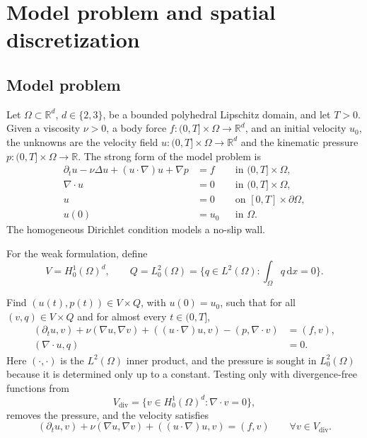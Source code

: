 \documentclass[11pt]{article}
\theoremstyle{remark}\newtheorem{remark}{Remark}
\newcommand{\R}{\mathbb{R}}
\newcommand{\dd}{\mathrm{d}}
\theoremstyle{plain}
\newcommand{\new}[1]{{\color{blue}#1}}
\begin{document}
\section{\new{Model problem and spatial discretization}}\label{sec:model}
\new{\subsection{Model problem}}
Let $\Omega\subset\R^d$, $d\in\{2,3\}$, be a bounded polyhedral Lipschitz domain, and let $T>0$. Given a viscosity $\nu>0$, a body force $f:(0,T]\times\Omega\to\R^d$, and an initial velocity $u_0$, the unknowns are the velocity field $u:(0,T]\times\Omega\to\R^d$ and the kinematic pressure $p:(0,T]\times\Omega\to\R$. The strong form of the model problem is
\begin{equation}\label{eq:strong-form}
\begin{aligned}
\partial_t u-\nu\Delta u+(u\cdot\nabla)u+\nabla p&=f &&\text{in }(0,T]\times\Omega,\\
\nabla\cdot u&=0 &&\text{in }(0,T]\times\Omega,\\
u&=0 &&\text{on }[0,T]\times\partial\Omega,\\
u(0)&=u_0 &&\text{in }\Omega.
\end{aligned}
\end{equation}
\new{The homogeneous Dirichlet condition models a no-slip wall.}

For the weak formulation, define
\[V=H_0^1(\Omega)^d,\qquad Q=L^2_0(\Omega)=\Big\{q\in L^2(\Omega):\int_\Omega q\,\dd x=0\Big\}.\]

Find $(u(t),p(t))\in V\times Q$, with $u(0)=u_0$, such that for all $(v,q)\in V\times Q$ and for almost every $t\in(0,T]$,
\begin{equation}\label{eq:weak-form}
\begin{aligned}
(\partial_tu,v)+\nu(\nabla u,\nabla v)+((u\cdot\nabla)u,v)-(p,\nabla\cdot v)&=(f,v),\\
(\nabla\cdot u,q)&=0.
\end{aligned}
\end{equation}
\new{Here $(\cdot,\cdot)$ is the $L^2(\Omega)$ inner product, and the pressure is sought in $L^2_0(\Omega)$ because it is determined only up to a constant. Testing only with divergence-free functions from}
\[V_{\mathrm{div}}=\{v\in H^1_0(\Omega)^d:\nabla\cdot v=0\},\]
\new{removes the pressure, and the velocity satisfies}
\begin{equation}\label{eq:div-free-weak-form}
(\partial_tu,v)+\nu(\nabla u,\nabla v)+((u\cdot\nabla)u,v)=(f,v)\qquad\forall v\in V_{\mathrm{div}}.
\end{equation}
\end{document}
